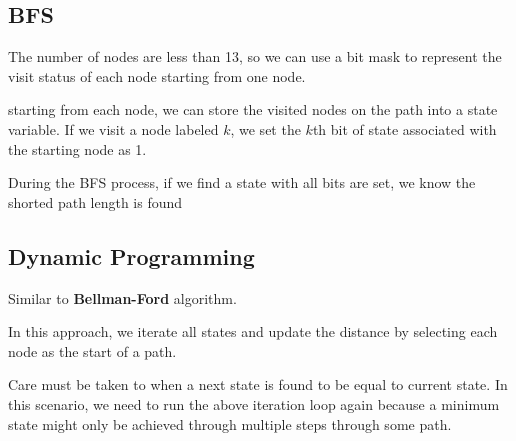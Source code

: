 \subsection{BFS}
The number of nodes are less than 13, so we can use a bit mask to represent the visit status of each node starting from one node.

starting from each node, we can store the visited nodes on the path into a state variable. If we visit a node labeled $k$, we set the $k$th bit of state associated with the starting node as 1.

During the BFS process, if we find a state with all bits are set, we know the shorted path length is found

\setcounter{lstlisting}{0}


\subsection{Dynamic Programming}
Similar to \textbf{Bellman-Ford} algorithm. 

In this approach, we iterate all states and update the distance by selecting each node as the start of a path. 

Care must be taken to when a next state is found to be equal to current state. In this scenario, we need to run the above iteration loop again because a minimum state might only be achieved through multiple steps through some path. 

\setcounter{lstlisting}{0}
